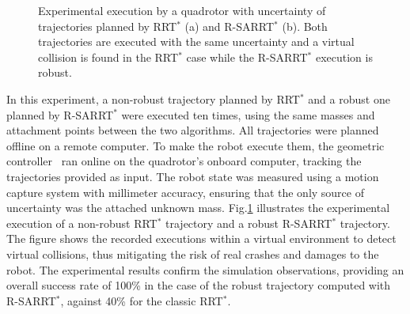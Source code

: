 \begin{figure} [h]
    \centering
    \caption{Experimental execution by a quadrotor with uncertainty of trajectories planned by  RRT$^*$ (a) and  R-SARRT$^*$ (b). Both trajectories are executed with the same uncertainty and a virtual collision is found in the RRT$^*$ case while the R-SARRT$^*$ execution is robust.}%
    \label{fig: exp window}%
\end{figure}

In this experiment, a non-robust trajectory planned by RRT$^*$ and a robust one planned by R-SARRT$^*$ were executed ten times, using the same masses and attachment points between the two algorithms.
All trajectories were planned offline on a remote computer. To make the robot execute them, the geometric controller~\cite{cLee} ran online on the quadrotor's onboard computer, tracking the trajectories provided as input. The robot state was measured using a motion capture system with millimeter accuracy, ensuring that the only source of uncertainty was the attached unknown mass.
Fig.\ref{fig: exp window} illustrates the experimental execution of a non-robust RRT$^*$ trajectory and a robust R-SARRT$^*$ trajectory. 
The figure shows the recorded executions within a virtual environment to detect virtual collisions, thus mitigating the risk of real crashes and damages to the robot.
The experimental results confirm the simulation observations, providing an overall success rate of 100\% in the case of the robust trajectory computed with R-SARRT$^*$, against 40\% for the classic RRT$^*$.

